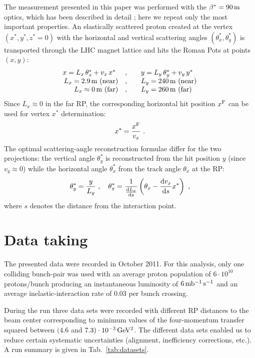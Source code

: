 \documentclass[doublecol]{../macros/epl2}
\def\d{{\rm d}}
\def\un#1{\,{\rm #1}}
\begin{document}
The measurement presented in this paper was performed with the $\beta^*=90\un{m}$ optics, which has been described in detail \cite{epl96}; here we repeat only the most important properties. An elastically scattered proton created at the vertex $(x^*, y^*, z^*=0)$ with the horizontal and vertical scattering angles $(\theta_x^*, \theta_y^*)$ is transported through the LHC magnet lattice and hits the Roman Pots at points $(x, y)$:
\begin{equation}
\label{eq:transport}
\begin{array}{rcl}
x = L_x\,\theta^*_x + v_x\,x^*\ &,\quad& y = L_y\,\theta^*_y + v_y\,y^* \\
L_x = 2.9\un{m} \hbox{ (near)}&,\quad& L_y = 240\un{m} \hbox{ (near)}\\
L_x \approx 0\un{m} \hbox{ (far)}&,\quad& L_y = 260\un{m}\hbox{ (far)}\\
\end{array}
\end{equation}
Since $L_x \approx 0$ in the far RP, the corresponding horizontal hit position $x^{\rm F}$ can be used for vertex $x^*$ determination:
\begin{equation}
\label{eq:vertex reconstruction}
x^* = {x^{\rm F}\over v_x}\ .
\end{equation}
The optimal scattering-angle reconstruction formulae differ for the two projections: the vertical angle $\theta^*_y$ is reconstructed from the hit position $y$ (since $v_y\approx 0$) while the horizontal angle $\theta^*_x$ from the track angle $\theta_x$ at the RP:
\begin{equation}
\label{eq:theta reconstruction}
\theta^*_y = {y\over L_y}\ ,\quad
\theta^*_x = {1\over {\d L_x\over \d s}} \left( \theta_x - {\d v_x\over \d s} x^* \right)\ ,
\end{equation}
where $s$ denotes the distance from the interaction point.


\section{Data taking}

The presented data were recorded in October 2011. For this analysis, only one colliding bunch-pair was used with an average proton population of $6\cdot10^{10}$ protons/bunch producing an instantaneous luminosity of $6\un{mb^{-1}\, s^{-1}}$ and an average inelastic-interaction rate of $0.03$ per bunch crossing.

During the run three data sets were recorded with different RP distances to the beam center corresponding to minimum values of the four-momentum transfer squared between $(4.6$ and $7.3)\cdot10^{-3}\un{GeV^2}$. The different data sets enabled us to reduce certain systematic uncertainties (alignment, inefficiency corrections, etc.). A run summary is given in Tab.~\ref{tab:datasets}.
\end{document}
